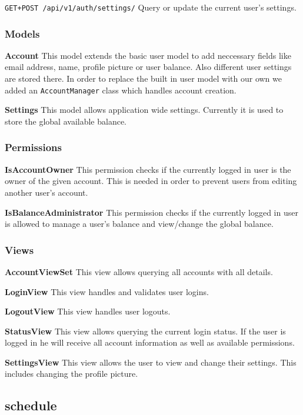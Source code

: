 \texttt{GET+POST\ /api/v1/auth/settings/} Query or update the current
user's settings.

\subsubsection{Models}\label{models-2}

\textbf{Account} This model extends the basic user model to add
neccessary fields like email address, name, profile picture or user
balance. Also different user settings are stored there. In order to
replace the built in user model with our own we added an
\texttt{AccountManager} class which handles account creation.

\textbf{Settings} This model allows application wide settings. Currently
it is used to store the global available balance.

\subsubsection{Permissions}\label{permissions-1}

\textbf{IsAccountOwner} This permission checks if the currently logged
in user is the owner of the given account. This is needed in order to
prevent users from editing another user's account.

\textbf{IsBalanceAdministrator} This permission checks if the currently
logged in user is allowed to manage a user's balance and view/change the
global balance.

\subsubsection{Views}\label{views-2}

\textbf{AccountViewSet} This view allows querying all accounts with all
details.

\textbf{LoginView} This view handles and validates user logins.

\textbf{LogoutView} This view handles user logouts.

\textbf{StatusView} This view allows querying the current login status.
If the user is logged in he will receive all account information as well
as available permissions.

\textbf{SettingsView} This view allows the user to view and change their
settings. This includes changing the profile picture.

\subsection{schedule}\label{schedule}

